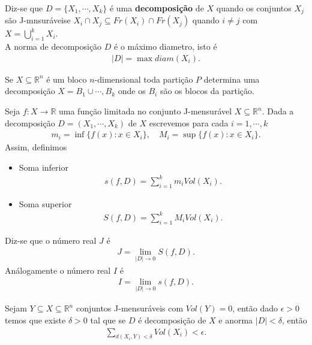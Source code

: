 \begin{definition}[Decomposição]
  Diz-se que $D=\{X_1,\cdots,X_k\}$ é uma \textbf{decomposição} de $X$ quando os conjuntos $X_j$ são J-mnsuráveise $X_i\cap X_j\subseteq Fr(X_i)\cap Fr(X_j)$ quando $i\neq j$ com $X=\bigcup_{i=1}^{k}X_{i}$.\\
  A norma de decomposição $D$ é o máximo diametro, isto é
  \begin{align*}
    |D|=\max diam(X_i).
  \end{align*}
\end{definition}
\begin{example}
  Se $X\subseteq\mathbb{R}^{n}$ é um bloco $n$-dimensional toda partição $P$ determina uma decomposição $X=B_1\cup\cdots,B_k$ onde os $B_i$ são os blocos da partição. 
\end{example}
\begin{definition}
  Seja $f:X\to\mathbb{R}$ uma função limitada no conjunto J-mensurável $X\subseteq\mathbb{R}^{n}$. Dada a decomposição $D=(X_1,\cdots,X_k)$ de $X$ escrevemos para cada $i=1,\cdots,k$
  \begin{align*}
    m_i=\inf\{f(x):x\in X_i\},\quad M_i=\sup\{f(x):x\in X_i\}.
  \end{align*}
  Assim, definimos
  \begin{itemize}
    \item Soma inferior
      \begin{align*}
        s(f,D)=\sum_{i=1}^{k}m_iVol(X_i).
      \end{align*}
     \item Soma superior
      \begin{align*}
        S(f,D)=\sum_{i=1}^{k}M_iVol(X_i).
      \end{align*}
  \end{itemize}
  Diz-se que o número real $J$ é
  \begin{align*}
    J=\lim_{|D| \to 0}S(f,D).  
  \end{align*}
  Análogamente
  o número real $I$ é
  \begin{align*}
    I=\lim_{|D| \to 0}s(f,D).
  \end{align*}
\end{definition}
\begin{lemma}
  Sejam $Y\subseteq X\subseteq \mathbb{R}^{n}$ conjuntos J-mensuráveis com $Vol(Y)=0$, então dado $\epsilon>0$ temos que existe $\delta>0$ tal que se $D$ é decomposição de $X$ e anorma $|D|<\delta$, então
  \begin{align*}
    \sum_{d(X_i,Y)<\delta}Vol(X_i)<\epsilon.
  \end{align*}
\end{lemma}

